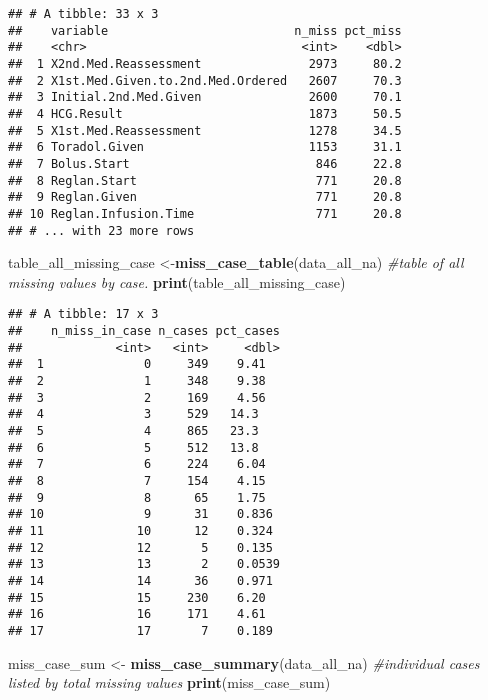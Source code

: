 \documentclass[]{article}
\newenvironment{Shaded}{\begin{snugshade}}{\end{snugshade}}
\newcommand{\KeywordTok}[1]{\textcolor[rgb]{0.13,0.29,0.53}{\textbf{#1}}}
\newcommand{\StringTok}[1]{\textcolor[rgb]{0.31,0.60,0.02}{#1}}
\newcommand{\CommentTok}[1]{\textcolor[rgb]{0.56,0.35,0.01}{\textit{#1}}}
\newcommand{\NormalTok}[1]{#1}
\begin{document}
\begin{verbatim}
## # A tibble: 33 x 3
##    variable                          n_miss pct_miss
##    <chr>                              <int>    <dbl>
##  1 X2nd.Med.Reassessment               2973     80.2
##  2 X1st.Med.Given.to.2nd.Med.Ordered   2607     70.3
##  3 Initial.2nd.Med.Given               2600     70.1
##  4 HCG.Result                          1873     50.5
##  5 X1st.Med.Reassessment               1278     34.5
##  6 Toradol.Given                       1153     31.1
##  7 Bolus.Start                          846     22.8
##  8 Reglan.Start                         771     20.8
##  9 Reglan.Given                         771     20.8
## 10 Reglan.Infusion.Time                 771     20.8
## # ... with 23 more rows
\end{verbatim}

\begin{Shaded}
\begin{Highlighting}[]
\NormalTok{table_all_missing_case <-}\KeywordTok{miss_case_table}\NormalTok{(data_all_na) }\CommentTok{#table of all missing values by case.}
\KeywordTok{print}\NormalTok{(table_all_missing_case)}
\end{Highlighting}
\end{Shaded}

\begin{verbatim}
## # A tibble: 17 x 3
##    n_miss_in_case n_cases pct_cases
##             <int>   <int>     <dbl>
##  1              0     349    9.41  
##  2              1     348    9.38  
##  3              2     169    4.56  
##  4              3     529   14.3   
##  5              4     865   23.3   
##  6              5     512   13.8   
##  7              6     224    6.04  
##  8              7     154    4.15  
##  9              8      65    1.75  
## 10              9      31    0.836 
## 11             10      12    0.324 
## 12             12       5    0.135 
## 13             13       2    0.0539
## 14             14      36    0.971 
## 15             15     230    6.20  
## 16             16     171    4.61  
## 17             17       7    0.189
\end{verbatim}

\begin{Shaded}
\begin{Highlighting}[]
\NormalTok{miss_case_sum <-}\StringTok{ }\KeywordTok{miss_case_summary}\NormalTok{(data_all_na) }\CommentTok{#individual cases listed by total missing values}
\KeywordTok{print}\NormalTok{(miss_case_sum)}
\end{Highlighting}
\end{Shaded}
\end{document}
